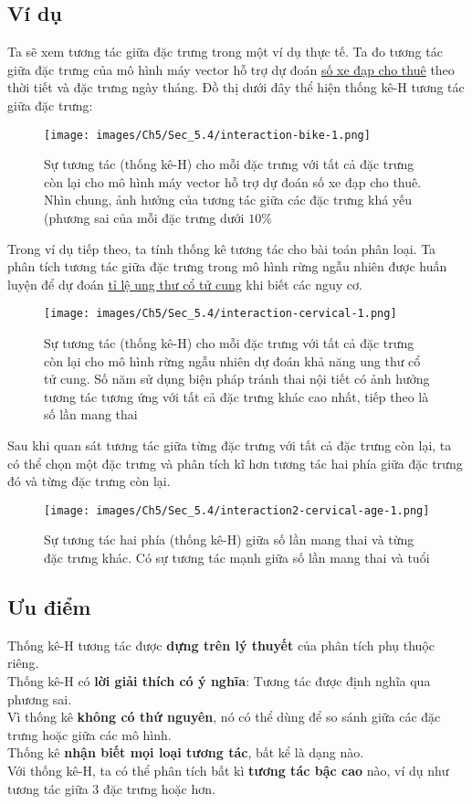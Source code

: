 \subsection{Ví dụ}
Ta sẽ xem tương tác giữa đặc trưng trong một ví dụ thực tế. Ta đo tương tác giữa đặc trưng của mô hình máy vector hỗ trợ dự đoán \href{chap_3.1}{số xe đạp cho thuê} theo thời tiết và đặc trưng ngày tháng. Đồ thị dưới đây thể hiện thống kê-H tương tác giữa đặc trưng:\\
\begin{figure*}[h!]
	\centering
	\texttt{[image: images/Ch5/Sec\_5.4/interaction-bike-1.png]}
	\label{fig:5_24}
	\caption{Sự tương tác (thống kê-H) cho mỗi đặc trưng với tất cả đặc trưng còn lại cho mô hình máy vector hỗ trợ dự đoán số xe đạp cho thuê. Nhìn chung, ảnh hưởng của tương tác giữa các đặc trưng khá yếu (phương sai của mỗi đặc trưng dưới $10\%$} 
\end{figure*}
Trong ví dụ tiếp theo, ta tính thống kê tương tác cho bài toán phân loại. Ta phân tích tương tác giữa đặc trưng trong mô hình rừng ngẫu nhiên được huấn luyện để dự đoán \href{chap_3.3}{tỉ lệ ung thư cổ tử cung} khi biết các nguy cơ.\\
\begin{figure*}[h!]
	\centering
	\texttt{[image: images/Ch5/Sec\_5.4/interaction-cervical-1.png]}
	\label{fig:5_25}
	\caption{Sự tương tác (thống kê-H) cho mỗi đặc trưng với tất cả đặc trưng còn lại cho mô hình rừng ngẫu nhiên dự đoán khả năng ung thư cổ tử cung. Số năm sử dụng biện pháp tránh thai nội tiết có ảnh hưởng tương tác tương ứng với tất cả đặc trưng khác cao nhất, tiếp theo là số lần mang thai}
\end{figure*}
Sau khi quan sát tương tác giữa từng đặc trưng với tất cả đặc trưng còn lại, ta có thể chọn một đặc trưng và phân tích kĩ hơn tương tác hai phía giữa đặc trưng đó và từng đặc trưng còn lại.\\
\begin{figure*}[h!]
	\centering
	\texttt{[image: images/Ch5/Sec\_5.4/interaction2-cervical-age-1.png]}
	\label{fig:5_26}
	\caption{Sự tương tác hai phía (thống kê-H) giữa số lần mang thai và từng đặc trưng khác. Có sự tương tác mạnh giữa số lần mang thai và tuổi}
\end{figure*}
\subsection{Ưu điểm}
Thống kê-H tương tác được \textbf{dựng trên lý thuyết} của phân tích phụ thuộc riêng.\\
Thống kê-H có \textbf{lời giải thích có ý nghĩa}: Tương tác được định nghĩa qua phương sai.\\
Vì thống kê \textbf{không có thứ nguyên}, nó có thể dùng để so sánh giữa các đặc trưng hoặc giữa các mô hình.\\
Thống kê \textbf{nhận biết mọi loại tương tác}, bất kể là dạng nào.\\
Với thống kê-H, ta có thể phân tích bất kì \textbf{tương tác bậc cao} nào, ví dụ như tương tác giữa 3 đặc trưng hoặc hơn.\\

